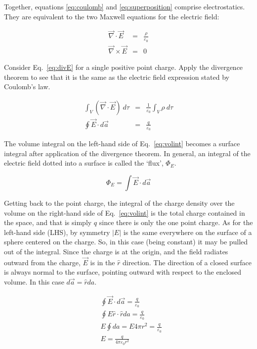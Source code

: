 \documentclass[12pt]{article}
\begin{document}
\begin{flushleft}
Together, equations \ref{eq:coulomb} and \ref{eq:superposition} comprise electrostatics.  They are equivalent to the two Maxwell equations for the electric field:

\begin{eqnarray}
 \vec{\nabla} \cdot \vec{E} & = & \frac{\rho}{\varepsilon_{0}} \label{eq:divE}\\
 \vec{\nabla} \times \vec{E} & = & 0 \nonumber 
\end{eqnarray}

Consider Eq.~\ref{eq:divE} for a single positive point charge.  Apply the divergence theorem to see that it is the same as the electric field expression stated by Coulomb's law.

\begin{eqnarray}
\int_{V} (\vec{\nabla} \cdot \vec{E}) \: d\tau & = & \frac{1}{\varepsilon_{0}} \int_{V} \rho \: d\tau \label{eq:volint} \\
\oint \vec{E} \cdot d\vec{a} & = & \frac{q}{\varepsilon_{0}} \nonumber  
\end{eqnarray}

The volume integral on the left-hand side of Eq.~\ref{eq:volint} becomes a surface integral after application of the divergence theorem.  In general, an integral of the electric field dotted into a surface is called the `flux', $\Phi_{E}$. 

\[
\Phi_{E} = \int \vec{E} \cdot d\vec{a}
\]

Getting back to the point charge, the integral of the charge density over the volume on the right-hand side of Eq.~\ref{eq:volint} is the total charge contained in the space, and that is simply $q$ since there is only the one point charge.  As for the left-hand side (LHS), by symmetry $|E|$ is the same everywhere on the surface of a sphere centered on the charge.  So, in this case (being constant) it may be pulled out of the integral.  Since the charge is at the origin, and the field radiates outward from the charge, $\vec{E}$ is in the $\hat{r}$ direction.  The direction of a closed surface is always normal to the surface, pointing outward with respect to the enclosed volume.  In this case $d\vec{a}=\hat{r}da$.

\begin{equation*}
\begin{aligned}
&  \oint \vec{E} \cdot d\vec{a} =  \frac{q}{\varepsilon_{0}} \\ 
&   \oint E\hat{r} \cdot \hat{r} da =  \frac{q}{\varepsilon_{0}}  \\
& E \oint da=  E4\pi r^{2} = \frac{q}{\varepsilon_{0}} \\
& E = \frac{q}{4 \pi \varepsilon_{0} r^{2}}
\end{aligned}
\end{equation*}


\end{flushleft}
\end{document}
